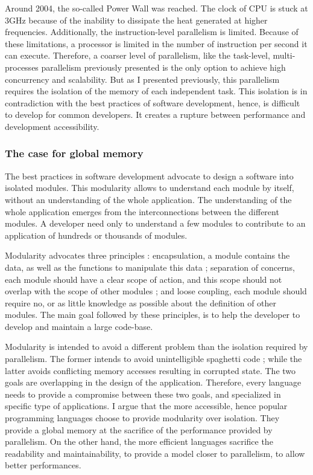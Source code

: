 Around 2004, the so-called Power Wall was reached.
The clock of CPU is stuck at 3GHz because of the inability to dissipate the heat generated at higher frequencies.
Additionally, the instruction-level parallelism is limited.
Because of these limitations, a processor is limited in the number of instruction per second it can execute.
Therefore, a coarser level of parallelism, like the task-level, multi-processes parallelism previously presented is the only option to achieve high concurrency and scalability.
But as I presented previously, this parallelism requires the isolation of the memory of each independent task.
This isolation is in contradiction with the best practices of software development, hence, is difficult to develop for common developers.
It creates a rupture between performance and development accessibility.

\subsubsection{The case for global memory}

The best practices in software development advocate to design a software into isolated modules.
This modularity allows to understand each module by itself, without an understanding of the whole application.
The understanding of the whole application emerges from the interconnections between the different modules.
A developer need only to understand a few modules to contribute to an application of hundreds or thousands of modules.

Modularity advocates three principles : encapsulation, a module contains the data, as well as the functions to manipulate this data ; separation of concerns, each module should have a clear scope of action, and this scope should not overlap with the scope of other modules ; and loose coupling, each module should require no, or as little knowledge as possible about the definition of other modules.
The main goal followed by these principles, is to help the developer to develop and maintain a large code-base.

Modularity is intended to avoid a different problem than the isolation required by parallelism.
The former intends to avoid unintelligible spaghetti code ; while the latter avoids conflicting memory accesses resulting in corrupted state.
The two goals are overlapping in the design of the application.
Therefore, every language needs to provide a compromise between these two goals, and specialized in specific type of applications.
I argue that the more accessible, hence popular programming languages choose to provide modularity over isolation.
They provide a global memory at the sacrifice of the performance provided by parallelism.
On the other hand, the more efficient languages sacrifice the readability and maintainability, to provide a model closer to parallelism, to allow better performances.


